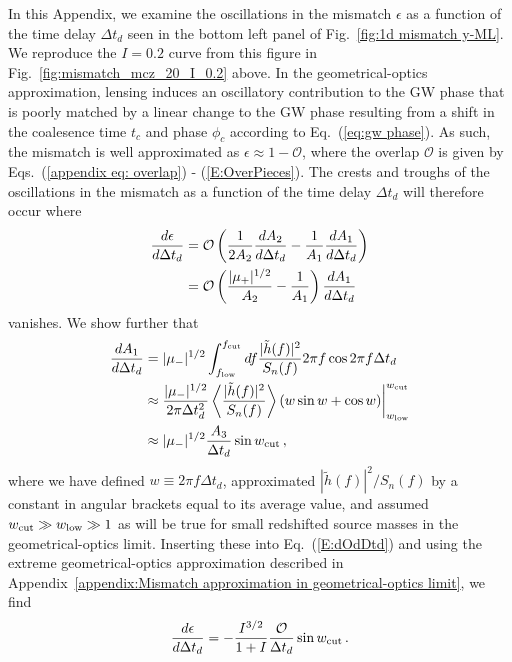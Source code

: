 \documentclass[floats,floatfix,showpacs,amssymb,prd,twocolumn,superscriptaddress,nofootinbib,nolongbibliography,reprint]{revtex4-2}
\begin{document}
In this Appendix, we examine the oscillations in the mismatch $\epsilon$ as a function of the time delay $\Delta t_d$ seen in the bottom left panel of Fig.~\ref{fig:1d mismatch y-ML}.  We reproduce the $I = 0.2$ curve from this figure in Fig.~\ref{fig:mismatch_mcz_20_I_0.2} above.  In the geometrical-optics approximation, lensing induces an oscillatory contribution to the GW phase that is poorly matched by a linear change to the GW phase resulting from a shift in the coalesence time $t_c$ and phase $\phi_c$ according to Eq.~(\ref{eq:gw phase}).  As such, the mismatch is well approximated as $\epsilon \approx 1 - \mathcal{O}$, where the overlap $\mathcal{O}$ is given by Eqs.~(\ref{appendix eq: overlap}) - (\ref{E:OverPieces}).  The crests and troughs of the oscillations in the mismatch as a function of the time delay $\Delta t_d$ will therefore occur where
\begin{align}
\frac{d\epsilon}{d\Delta t_d} &= \mathcal{O}\left(\frac{1}{2A_2}\frac{dA_2}{d\Delta t_d} - \frac{1}{A_1}\frac{dA_1}{d\Delta t_d} \right) \notag \\
&= \mathcal{O}\left( \frac{|\mu_+|^{1/2}}{A_2} - \frac{1}{A_1} \right) \frac{dA_1}{d\Delta t_d} \label{E:dOdDtd}
\end{align}
vanishes.  We show further that
\begin{subequations}
\begin{align}
\frac{dA_1}{d\Delta t_d} &= |\mu_-|^{1/2} \int_{f_{\rm low}}^{f_{\rm cut}} df \frac{|\tilde{h}(f)|^2}{S_n(f)}2\pi f\cos 2\pi f \Delta t_d \\
&\approx \frac{|\mu_-|^{1/2}}{2\pi\Delta t_d^2} \left\langle \frac{|\tilde{h}(f)|^2}{S_n(f)} \right\rangle (w\sin w + \cos w)\bigg|_{w_{\rm low}}^{w_{\rm cut}} \\
&\approx |\mu_-|^{1/2}\frac{A_3}{\Delta t_d}\sin w_{\rm cut}\,,
\end{align}
\end{subequations}
where we have defined $w \equiv 2\pi f\Delta t_d$, approximated $|\tilde{h}(f)|^2/S_n(f)$ by a constant in angular brackets equal to its average value, and assumed $w_{\rm cut} \gg w_{\rm low} \gg 1$ as will be true for small redshifted source masses in the geometrical-optics limit.  Inserting these into Eq.~(\ref{E:dOdDtd}) and using the extreme geometrical-optics approximation described in Appendix~\ref{appendix:Mismatch approximation in geometrical-optics limit}, we find
\begin{equation} \label{E:depdtd}
\frac{d\epsilon}{d\Delta t_d} = -\frac{I^{3/2}}{1 + I} \frac{\mathcal{O}}{\Delta t_d} \sin w_{\rm cut}\,.
\end{equation}
\end{document}
